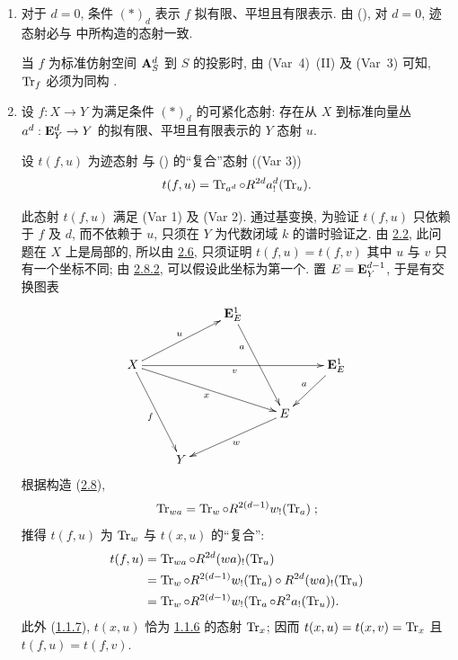 \begin{enumerate}
\renewcommand{\theenumi}{\alph{enumi}}
\renewcommand{\labelenumi}{\theenumi)}
\item 对于 $d=0$, 条件 $(\ast)_{d}$ 表示 $f$ 拟有限、平坦且有限表示. 由 (), 对 $d=0$, 迹态射必与 \loccit{} 中所构造的态射一致.

当 $f$ 为标准仿射空间 $\mathbf{A}^{d}_{S}$ 到 $S$ 的投影时, 由 (Var~4)~(II) 及 (Var~3) 可知, $\operatorname{Tr}_{f}$ 必须为同构 .

\item 设 $f:X\rightarrow Y$ 为满足条件 $(\ast)_{d}$ 的可紧化态射: 存在从 $X$ 到标准向量丛 $a^{d}:\mathbf{E}^{d}_{Y}\rightarrow Y$ 的拟有限、平坦且有限表示的 $Y$ 态射 $u$.

设 $t(f,u)$ 为迹态射  与 (\SGA {}) 的“复合”态射 (\cf (Var 3))
$$
t(f,u)=\operatorname{Tr}_{a^d}\circ R^{2d}a^{d}_{!}(\operatorname{Tr}_{u}){}.
$$

此态射 $t(f,u)$ 满足 (Var 1) 及 (Var 2). 通过基变换, 为验证 $t(f,u)$ 只依赖于 $f$ 及 $d$, 而不依赖于 $u$, 只须在 $Y$ 为代数闭域 $k$ 的谱时验证之. 由 \hyperref[XVIII.lem2.2]{2.2}, 此问题在 $X$ 上是局部的, 所以由 \hyperref[XVIII.lem2.6]{2.6}, 只须证明
$t(f,u)=t(f,v)$
其中 $u$ 与 $v$ 只有一个坐标不同; 由 \hyperref[XVIII.subsubsec2.8.2]{2.8.2}, 可以假设此坐标为第一个. 置 $E=\mathbf{E}^{d-1}_{Y}$, 于是有交换图表
$$
\xymatrix{
                              &    &\EE^1_{E} \ar[rdd]_(.3){a} &  &  \\
X \ar[rrrr]_{v}\ar[rru]^{u} \ar[rdd]_{f} \ar[rrrd]_{x}&    &                 &
                              &\EE^{1}_E \ar[ld]_{a}\\
                              &    &                 &E \ar[lld]^w& \\
                              & Y  &                 &  &
}
$$
根据\pageoriginale 构造 (\hyperref[XVIII.subsec2.8]{2.8}),
$$
\operatorname{Tr}_{wa}=\operatorname{Tr}_{w}\circ R^{2(d-1)}w_!(\operatorname{Tr}_{a}){}\;;
$$
推得 $t(f,u)$ 为 $\operatorname{Tr}_{w}$ 与 $t(x,u)$ 的“复合”:
\begin{align*}
t(f,u) &= \operatorname{Tr}_{wa}\circ R^{2d}(wa)_{!}(\operatorname{Tr}_{u})\\
       &= \operatorname{Tr}_{w}\circ R^{2(d-1)}w_{!}(\operatorname{Tr}_{a})\circ
       R^{2d}(wa)_{!}(\operatorname{Tr}_{u})\\
       &= \operatorname{Tr}_{w}\circ R^{2(d-1)}w_{!}(\operatorname{Tr}_{a}\circ
       R^{2}a_{!}(\operatorname{Tr}_{u})){}.
\end{align*}
此外 (\hyperref[XVIII.lem1.1.7]{1.1.7}), $t(x,u)$ 恰为 \hyperref[XVIII.prop1.1.6]{1.1.6} 的态射 $\operatorname{Tr}_{x}$; 因而 $t(x,u)=t(x,v)=\operatorname{Tr}_{x}$ 且 $t(f,u)=t(f,v)$.


\end{enumerate}
